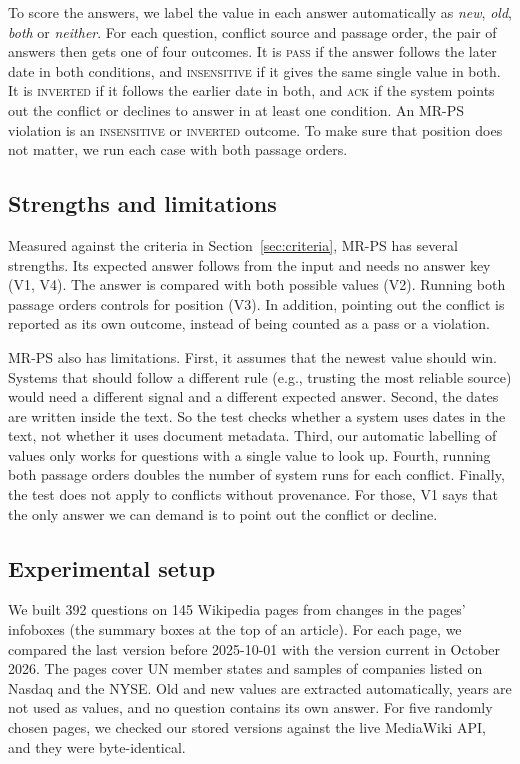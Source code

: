 \documentclass[preprint,12pt,authoryear]{elsarticle}
\newcommand{\mrps}{\textsc{MR-PS}}
\begin{document}
To score the answers, we label the value in each answer automatically as \emph{new}, \emph{old},
\emph{both} or \emph{neither}. For each question, conflict source and passage order, the pair of
answers then gets one of four outcomes. It is \textsc{pass} if the answer follows the later date in
both conditions, and \textsc{insensitive} if it gives the same single value in both. It is
\textsc{inverted} if it follows the earlier date in both, and \textsc{ack} if the system points out
the conflict or declines to answer in at least one condition. An \mrps{} violation is an
\textsc{insensitive} or \textsc{inverted} outcome. To make sure that position does not matter, we run
each case with both passage orders.

\subsection{Strengths and limitations}
Measured against the criteria in Section~\ref{sec:criteria}, \mrps{} has several strengths. Its
expected answer follows from the input and needs no answer key (V1, V4). The answer is compared with
both possible values (V2). Running both passage orders controls for position (V3). In addition,
pointing out the conflict is reported as its own outcome, instead of being counted as a pass or a
violation.

\mrps{} also has limitations. First, it assumes that the newest value should win. Systems that should
follow a different rule (e.g., trusting the most reliable source) would need a different signal and
a different expected answer. Second, the dates are written inside the text. So the test checks
whether a system uses dates in the text, not whether it uses document metadata. Third, our automatic
labelling of values only works for questions with a single value to look up. Fourth, running both
passage orders doubles the number of system runs for each conflict. Finally, the test does not apply
to conflicts without provenance. For those, V1 says that the only answer we can demand is to point
out the conflict or decline.

\subsection{Experimental setup}
We built 392 questions on 145 Wikipedia pages from changes in the pages' infoboxes (the summary boxes
at the top of an article). For each page, we compared the last version before 2025-10-01 with the
version current in October 2026. The pages cover UN member states and samples of companies listed on
Nasdaq and the NYSE. Old and new values are extracted automatically, years are not used as values,
and no question contains its own answer. For five randomly chosen pages, we checked our stored
versions against the live MediaWiki API, and they were byte-identical.
\end{document}
